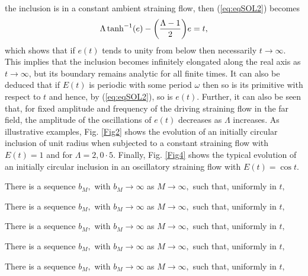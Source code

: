 \documentclass{article}
\begin{document}
the inclusion is in a constant ambient straining flow, then
(\ref{eq:eqSOL2})  becomes
\begin{equation}
\Lambda \tanh^{-1}(e) -{\left({\Lambda -1 \over 2}\right)} e=  t,
\end{equation}
which shows that if $e(t)$ tends to unity
from below then necessarily $t \to \infty$. This implies  that the inclusion
becomes infinitely elongated along the real axis as $t \to \infty$,
but its boundary remains analytic for all finite times.
It can also be deduced that if $E(t)$ is periodic with some period $\omega$
then so is its primitive with respect to $t$ and hence, by (\ref{eq:eqSOL2}),
so is $e(t)$. Further, it can also be seen that, for fixed amplitude and frequency of the driving straining flow in the far field,
the amplitude of the oscillations of $e(t)$ decreases as $\Lambda$ increases.
As illustrative examples, Fig. \ref{Fig2} shows the evolution
of an initially circular inclusion of unit radius when subjected
to a constant straining flow with $E(t)=1$ and for $\Lambda=2, 0{\cdot}5$.
Finally, Fig. \ref{Fig4} shows the typical evolution of
an initially circular inclusion in an oscillatory straining
flow with $E(t)=\cos t$.
\begin{cor}
There is a sequence $b_{M},$ with $%
b_{M}\rightarrow \infty $ as $M\rightarrow \infty ,$ such that, uniformly in
$t,$
\end{cor}
\begin{cor}
There is a sequence $b_{M},$ with $%
b_{M}\rightarrow \infty $ as $M\rightarrow \infty ,$ such that, uniformly in
$t,$
\end{cor}
\begin{prop}
There is a sequence $b_{M},$ with $%
b_{M}\rightarrow \infty $ as $M\rightarrow \infty ,$ such that, uniformly in
$t,$
\end{prop}

\begin{theorem}
There is a sequence $b_{M},$ with $%
b_{M}\rightarrow \infty $ as $M\rightarrow \infty ,$ such that, uniformly in
$t,$
\end{theorem}
\begin{assum}
There is a sequence $b_{M},$ with $%
b_{M}\rightarrow \infty $ as $M\rightarrow \infty ,$ such that, uniformly in
$t,$
\end{assum}
\end{document}

